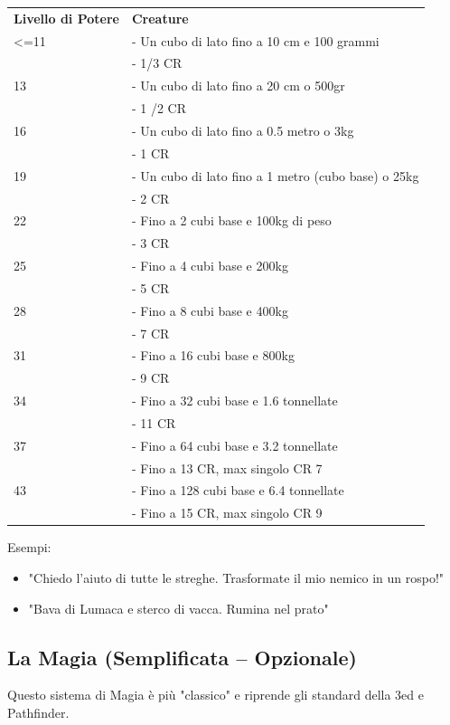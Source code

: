 \documentclass[a4paper,11pt,twoside,openany]{book}
\begin{document}
\bigskip

\begin{tabular}{L{3cm} L{10cm}}
\toprule
\textbf{Livello di Potere} & \textbf{Creature}\tabularnewline
<=11& - Un cubo di lato fino a 10 cm e 100 grammi\\
&- 1/3 CR\\
13& - Un cubo di lato fino a 20 cm o 500gr\\
&- 1 /2 CR\\
16& - Un cubo di lato fino a 0.5 metro o 3kg\\
&- 1 CR\\
19& - Un cubo di lato fino a 1 metro (cubo base) o 25kg\\
&- 2 CR\\
22& - Fino a 2 cubi base e 100kg di peso\\
&- 3 CR\\
25& - Fino a 4 cubi base e 200kg\\
&- 5 CR\\
28& - Fino a 8 cubi base e 400kg\\
&- 7 CR\\
31& - Fino a 16 cubi base e 800kg\\
&- 9 CR\\
34& - Fino a 32 cubi base e 1.6 tonnellate\\
&- 11 CR\\
37& - Fino a 64 cubi base e 3.2 tonnellate\\
&- Fino a 13 CR, max singolo CR 7\\
43& - Fino a 128 cubi base e 6.4 tonnellate\\
&- Fino a 15 CR, max singolo CR 9\\
\end{tabular}

\bigskip


Esempi:
\begin{itemize}
\item 
"Chiedo l'aiuto di tutte le streghe. Trasformate il mio nemico in un rospo!" 
\item 
"Bava di Lumaca e sterco di vacca. Rumina nel prato" 
\end{itemize}

\pagebreak

\subsection{La Magia (Semplificata -- Opzionale)}


Questo sistema di Magia è più "classico" e riprende gli standard della 3ed e Pathfinder.
\end{document}
